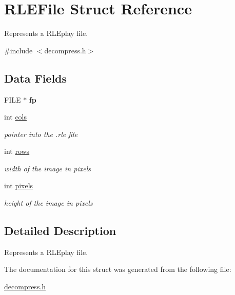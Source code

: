 \hypertarget{struct_r_l_e_file}{\section{R\-L\-E\-File Struct Reference}
\label{struct_r_l_e_file}
}


Represents a R\-L\-Eplay file.  




{\ttfamily \#include $<$decompress.\-h$>$}

\subsection*{Data Fields}
\begin{DoxyCompactItemize}
\item 
\hypertarget{struct_r_l_e_file_aa065f30aa9f5f9a42132c82c787ee70b}{F\-I\-L\-E $\ast$ {\bfseries fp}}\label{struct_r_l_e_file_aa065f30aa9f5f9a42132c82c787ee70b}

\item 
\hypertarget{struct_r_l_e_file_a4407a60bc4387adae24cee658711f2d9}{int \hyperlink{struct_r_l_e_file_a4407a60bc4387adae24cee658711f2d9}{cols}}\label{struct_r_l_e_file_a4407a60bc4387adae24cee658711f2d9}

\begin{DoxyCompactList}\small\item\em pointer into the {\ttfamily }.rle file \end{DoxyCompactList}\item 
\hypertarget{struct_r_l_e_file_a061459acc9e078fa4699e0e349887215}{int \hyperlink{struct_r_l_e_file_a061459acc9e078fa4699e0e349887215}{rows}}\label{struct_r_l_e_file_a061459acc9e078fa4699e0e349887215}

\begin{DoxyCompactList}\small\item\em width of the image in pixels \end{DoxyCompactList}\item 
\hypertarget{struct_r_l_e_file_a5d41cf5ef2316b748ed36ffecb4d54bd}{int \hyperlink{struct_r_l_e_file_a5d41cf5ef2316b748ed36ffecb4d54bd}{pixels}}\label{struct_r_l_e_file_a5d41cf5ef2316b748ed36ffecb4d54bd}

\begin{DoxyCompactList}\small\item\em height of the image in pixels \end{DoxyCompactList}\end{DoxyCompactItemize}


\subsection{Detailed Description}
Represents a R\-L\-Eplay file. 

The documentation for this struct was generated from the following file\-:\begin{DoxyCompactItemize}
\item 
\hyperlink{decompress_8h}{decompress.\-h}\end{DoxyCompactItemize}
